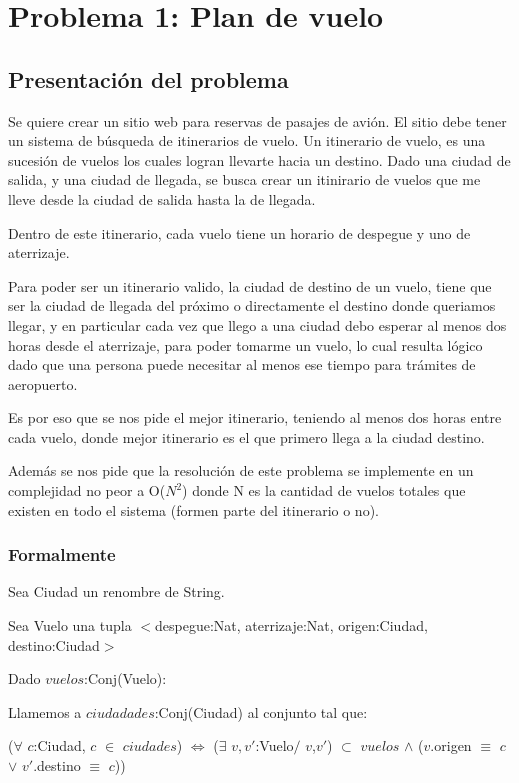 \section{Problema 1: Plan de vuelo}

\subsection{Presentación del problema}

Se quiere crear un sitio web para reservas de pasajes de avi\'on. El sitio debe tener un sistema de b\'usqueda de itinerarios de vuelo. Un itinerario de vuelo, es una sucesi\'on de vuelos los cuales logran llevarte hacia un destino. Dado una ciudad de salida, y una ciudad de llegada, se busca crear un itinirario de vuelos que me lleve desde la ciudad de salida hasta la de llegada.

Dentro de este itinerario, cada vuelo tiene un horario de despegue y uno de aterrizaje. 

Para poder ser un itinerario valido, la ciudad de destino de un vuelo, tiene que ser la ciudad de llegada del pr\'oximo o directamente el destino donde queriamos llegar, y en particular cada vez que llego a una ciudad debo esperar al menos dos horas desde el aterrizaje, para poder tomarme un vuelo, lo cual resulta l\'ogico dado que una persona puede necesitar al menos ese tiempo para tr\'amites de aeropuerto.

Es por eso que se nos pide el mejor itinerario, teniendo al menos dos horas entre cada vuelo, donde mejor itinerario es el que primero llega a la ciudad destino.

Adem\'as se nos pide que la resoluci\'on de este problema se implemente en un complejidad no peor a O($N^{2}$) donde N es la cantidad de vuelos totales que existen en todo el sistema (formen parte del itinerario o no).

\newpage
\subsubsection{Formalmente}


Sea Ciudad un renombre de String.

Sea Vuelo una tupla $<$despegue:Nat, aterrizaje:Nat, origen:Ciudad, destino:Ciudad$>$

Dado $vuelos$:Conj(Vuelo):

Llamemos a $ciudadades$:Conj(Ciudad) al conjunto tal que:

($\forall$ $c$:Ciudad, $c$ $\in$ $ciudades$)  $\Leftrightarrow$ ($\exists$ $v,v'$:Vuelo$/$ $v$,$v'$) $\subset$ $vuelos$ $\wedge$ ($v$.origen $\equiv$ $c$ $\vee$ $v'$.destino $\equiv$ $c$))

